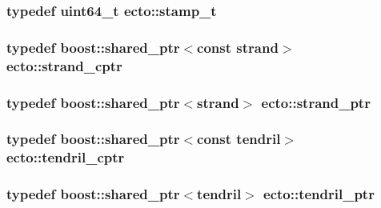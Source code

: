 \subsubsection[{stamp\+\_\+t}]{\setlength{\rightskip}{0pt plus 5cm}typedef uint64\+\_\+t {\bf ecto\+::stamp\+\_\+t}}\label{namespaceecto_a96ba8fa498cc4b8e2a0217a9e236b50d}
\hypertarget{namespaceecto_abbad20d834739bbf762269e4e04a6732}{}
\subsubsection[{strand\+\_\+cptr}]{\setlength{\rightskip}{0pt plus 5cm}typedef boost\+::shared\+\_\+ptr$<$const {\bf strand}$>$ {\bf ecto\+::strand\+\_\+cptr}}\label{namespaceecto_abbad20d834739bbf762269e4e04a6732}
\hypertarget{namespaceecto_a98ca3b7b690de778292922c806e7588d}{}
\subsubsection[{strand\+\_\+ptr}]{\setlength{\rightskip}{0pt plus 5cm}typedef boost\+::shared\+\_\+ptr$<${\bf strand}$>$ {\bf ecto\+::strand\+\_\+ptr}}\label{namespaceecto_a98ca3b7b690de778292922c806e7588d}
\hypertarget{namespaceecto_ad01f26ee47597f71a6f86ee34bb3ffe4}{}
\subsubsection[{tendril\+\_\+cptr}]{\setlength{\rightskip}{0pt plus 5cm}typedef boost\+::shared\+\_\+ptr$<$const {\bf tendril}$>$ {\bf ecto\+::tendril\+\_\+cptr}}\label{namespaceecto_ad01f26ee47597f71a6f86ee34bb3ffe4}
\hypertarget{namespaceecto_a84fb5f6130275382e5cbeb5fdececa78}{}
\subsubsection[{tendril\+\_\+ptr}]{\setlength{\rightskip}{0pt plus 5cm}typedef boost\+::shared\+\_\+ptr$<${\bf tendril}$>$ {\bf ecto\+::tendril\+\_\+ptr}}\label{namespaceecto_a84fb5f6130275382e5cbeb5fdececa78}
\hypertarget{namespaceecto_a6165b23b34082cfc17104ca7e9f1b212}{}
